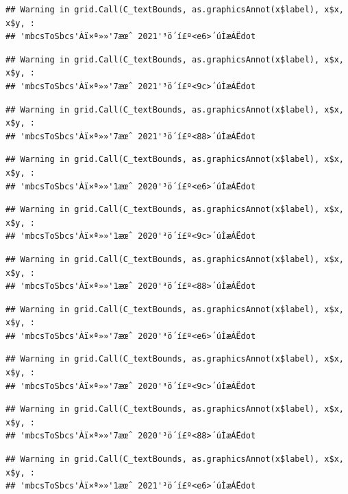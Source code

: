 \documentclass[
]{book}
\begin{document}
\begin{verbatim}
## Warning in grid.Call(C_textBounds, as.graphicsAnnot(x$label), x$x, x$y, :
## 'mbcsToSbcs'Àï×ª»»'7æœˆ 2021'³ö´í£º<e6>´úÌæÁËdot
\end{verbatim}

\begin{verbatim}
## Warning in grid.Call(C_textBounds, as.graphicsAnnot(x$label), x$x, x$y, :
## 'mbcsToSbcs'Àï×ª»»'7æœˆ 2021'³ö´í£º<9c>´úÌæÁËdot
\end{verbatim}

\begin{verbatim}
## Warning in grid.Call(C_textBounds, as.graphicsAnnot(x$label), x$x, x$y, :
## 'mbcsToSbcs'Àï×ª»»'7æœˆ 2021'³ö´í£º<88>´úÌæÁËdot
\end{verbatim}

\begin{verbatim}
## Warning in grid.Call(C_textBounds, as.graphicsAnnot(x$label), x$x, x$y, :
## 'mbcsToSbcs'Àï×ª»»'1æœˆ 2020'³ö´í£º<e6>´úÌæÁËdot
\end{verbatim}

\begin{verbatim}
## Warning in grid.Call(C_textBounds, as.graphicsAnnot(x$label), x$x, x$y, :
## 'mbcsToSbcs'Àï×ª»»'1æœˆ 2020'³ö´í£º<9c>´úÌæÁËdot
\end{verbatim}

\begin{verbatim}
## Warning in grid.Call(C_textBounds, as.graphicsAnnot(x$label), x$x, x$y, :
## 'mbcsToSbcs'Àï×ª»»'1æœˆ 2020'³ö´í£º<88>´úÌæÁËdot
\end{verbatim}

\begin{verbatim}
## Warning in grid.Call(C_textBounds, as.graphicsAnnot(x$label), x$x, x$y, :
## 'mbcsToSbcs'Àï×ª»»'7æœˆ 2020'³ö´í£º<e6>´úÌæÁËdot
\end{verbatim}

\begin{verbatim}
## Warning in grid.Call(C_textBounds, as.graphicsAnnot(x$label), x$x, x$y, :
## 'mbcsToSbcs'Àï×ª»»'7æœˆ 2020'³ö´í£º<9c>´úÌæÁËdot
\end{verbatim}

\begin{verbatim}
## Warning in grid.Call(C_textBounds, as.graphicsAnnot(x$label), x$x, x$y, :
## 'mbcsToSbcs'Àï×ª»»'7æœˆ 2020'³ö´í£º<88>´úÌæÁËdot
\end{verbatim}

\begin{verbatim}
## Warning in grid.Call(C_textBounds, as.graphicsAnnot(x$label), x$x, x$y, :
## 'mbcsToSbcs'Àï×ª»»'1æœˆ 2021'³ö´í£º<e6>´úÌæÁËdot
\end{verbatim}
\end{document}

